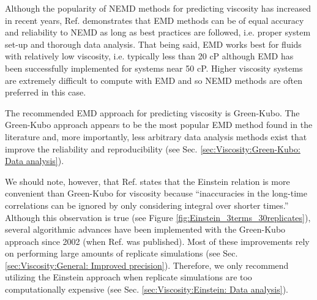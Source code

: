 \documentclass[9pt,bestpractices]{livecoms}
\begin{document}


Although the popularity of NEMD methods for predicting viscosity has increased in recent years, Ref. \cite{Chen2009} demonstrates that EMD methods can be of equal accuracy and reliability to NEMD as long as best practices are followed, i.e. proper system set-up and thorough data analysis. That being said, EMD works best for fluids with relatively low viscosity, i.e. typically less than 20 cP although EMD has been successfully implemented for systems near 50 cP. Higher viscosity systems are extremely difficult to compute with EMD and so NEMD methods are often preferred in this case.

The recommended EMD approach for predicting viscosity is Green-Kubo. The Green-Kubo approach appears to be the most popular EMD method found in the literature and, more importantly, less arbitrary data analysis methods exist that improve the reliability and reproducibility (see Sec. \ref{sec:Viscosity:Green-Kubo: Data analysis}). 

We should note, however, that Ref. \cite{Hess2002} states that the Einstein relation is more convenient than Green-Kubo for viscosity because ``inaccuracies in the long-time correlations can be ignored by only considering integral over shorter times.'' 
Although this observation is true (see Figure \ref{fig:Einstein_3terms_30replicates}), several algorithmic advances have been implemented with the Green-Kubo approach since 2002 (when Ref. \cite{Hess2002} was published). Most of these improvements rely on performing large amounts of replicate simulations (see Sec. \ref{sec:Viscosity:General: Improved precision}). Therefore, we only recommend utilizing the Einstein approach when replicate simulations are too computationally expensive (see Sec. \ref{sec:Viscosity:Einstein: Data analysis}).  
\end{document}
